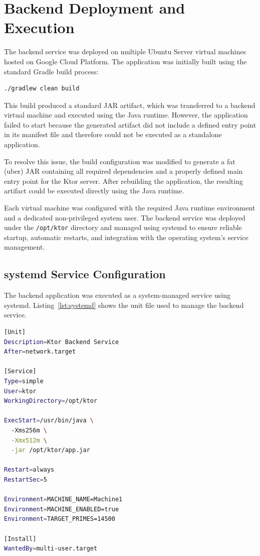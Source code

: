 \documentclass[conference]{IEEEtran}
\begin{document}
\section{Backend Deployment and Execution}

The backend service was deployed on multiple Ubuntu Server virtual machines hosted on Google Cloud Platform. The application was initially built using the standard Gradle build process:

\begin{lstlisting}[language=bash, caption=Initial Gradle build command]
./gradlew clean build
\end{lstlisting}

This build produced a standard JAR artifact, which was transferred to a backend virtual machine and executed using the Java runtime. However, the application failed to start because the generated artifact did not include a defined entry point in its manifest file and therefore could not be executed as a standalone application.

To resolve this issue, the build configuration was modified to generate a fat (uber) JAR containing all required dependencies and a properly defined main entry point for the Ktor server. After rebuilding the application, the resulting artifact could be executed directly using the Java runtime.

Each virtual machine was configured with the required Java runtime environment and a dedicated non-privileged system user. The backend service was deployed under the \texttt{/opt/ktor} directory and managed using systemd to ensure reliable startup, automatic restarts, and integration with the operating system’s service management.

\subsection{systemd Service Configuration}

The backend application was executed as a system-managed service using systemd. Listing~\ref{lst:systemd} shows the unit file used to manage the backend service.

\begin{lstlisting}[language=bash, caption=systemd service definition for the Ktor backend, label=lst:systemd]
[Unit]
Description=Ktor Backend Service
After=network.target

[Service]
Type=simple
User=ktor
WorkingDirectory=/opt/ktor

ExecStart=/usr/bin/java \
  -Xms256m \
  -Xmx512m \
  -jar /opt/ktor/app.jar

Restart=always
RestartSec=5

Environment=MACHINE_NAME=Machine1
Environment=MACHINE_ENABLED=true
Environment=TARGET_PRIMES=14500

[Install]
WantedBy=multi-user.target
\end{lstlisting}
\end{document}
